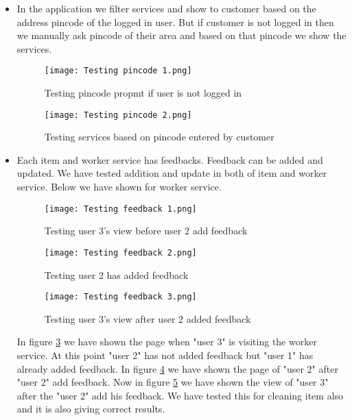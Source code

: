 \documentclass[conference]{IEEEtran}
\begin{document}
\begin{itemize}
    \item In the application we filter services and show to customer based on the address pincode of the logged in user. But if customer is not logged in then we manually ask pincode of their area and based on that pincode we show the services.
    \begin{figure}[H]
        \centering
        \texttt{[image: Testing pincode 1.png]}
        \caption{Testing pincode propmt if user is not logged in}
        \label{fig:testPincode1}
    \end{figure}
    \begin{figure}[H]
        \centering
        \texttt{[image: Testing pincode 2.png]}
        \caption{Testing services based on pincode entered by customer}
        \label{fig:testPincode2}
    \end{figure}
    
    \item Each item and worker service has feedbacks. Feedback can be added and updated. We have tested addition and update in both of item and worker service. Below we have shown for worker service.
    \begin{figure}[H]
        \centering
        \texttt{[image: Testing feedback 1.png]}
        \caption{Testing user 3's view before user 2 add feedback}
        \label{fig:testFeedback1}
    \end{figure}
    \begin{figure}[H]
        \centering
        \texttt{[image: Testing feedback 2.png]}
        \caption{Testing user 2 has added feedback}
        \label{fig:testFeedback2}
    \end{figure}
    \begin{figure}[H]
        \centering
        \texttt{[image: Testing feedback 3.png]}
        \caption{Testing user 3's view after user 2 added feedback}
        \label{fig:testFeedback3}
    \end{figure}
    
    In figure \ref{fig:testFeedback1} we have shown the page when "user 3" is visiting the worker service. At this point "user 2" has not added feedback but "user 1" has already added feedback. In figure \ref{fig:testFeedback2} we have shown the page of "user 2" after "user 2" add feedback. Now in figure \ref{fig:testFeedback3} we have shown the view of "user 3" after the "user 2" add his feedback. We have tested this for cleaning item also and it is also giving correct results.
    

\end{itemize}
\end{document}
